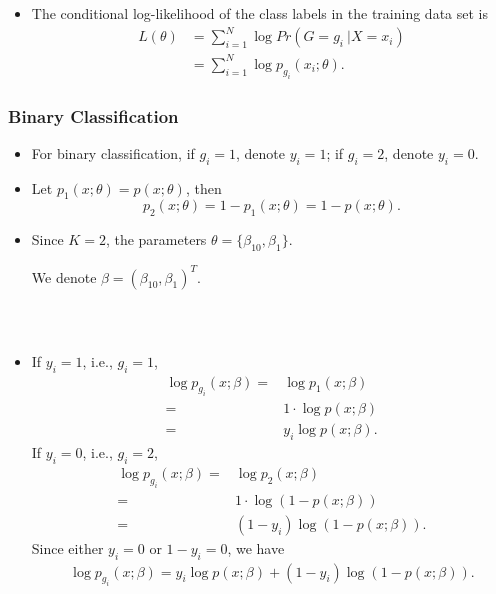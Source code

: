 \documentclass[12pt,notes,mathserif]{beamer}
\begin{document}
\begin{frame}[c]
	\frametitle{~}
	\begin{itemize}
		\item  The conditional log-likelihood of the class labels in the training data set is
		      \begin{align*}
			      L(\theta) & =\sum\limits_{i=1}^{N}\log Pr(G=g_i~|X=x_i)      \\
			                & =\sum\limits_{i=1}^{N} \log p_{g_i}(x_i;\theta).
		      \end{align*}
	\end{itemize}
\end{frame}



\begin{frame}[c]
	\frametitle{Binary Classification}
	\begin{itemize}
		\item
		      For binary classification, if $g_i = 1$, denote $y_i = 1$; if $g_i = 2$, denote $y_i = 0$.

		\item
		      Let $p_1(x;\theta)=p(x;\theta)$, then
		      \begin{equation*}
			      p_2(x;\theta)=1-p_1(x;\theta)=1-p(x;\theta).
		      \end{equation*}

		\item Since $K = 2$, the parameters $\theta = \{\beta_{10},\beta_1\}$.

		      We denote $\beta  = (\beta_{10},\beta_1 )^T$.

	\end{itemize}

\end{frame}


\begin{frame}[c]
	\frametitle{~}
	\begin{itemize}
		\item
		      If $y_i = 1$, i.e., $g_i = 1$,
		      \begin{align*}
			      \log p_{g_i}(x;\beta ) = & \log p_1 (x;\beta )      \\
			      =                        & 1 \cdot \log p(x;\beta ) \\
			      =                        & y_i \log p(x;\beta ).
		      \end{align*}
		      If $y_i = 0$, i.e., $g_i = 2$,
		      \begin{align*}
			      \log p_{g_i}(x;\beta ) = & \log p_2 (x;\beta )               \\
			      =                        & 1 \cdot  \log (1 − p(x;\beta ))   \\
			      =                        & (1 − y_i )\log (1 − p(x;\beta )).
		      \end{align*}
		      Since either $y_i = 0$ or $1 − y_i = 0$, we have
		      \begin{align*}
			      \log p_{g_i}(x;\beta ) = y_i \log p(x;\beta ) + (1 − y_i )\log (1 − p(x;\beta )).
		      \end{align*}
	\end{itemize}
\end{frame}
\end{document}
